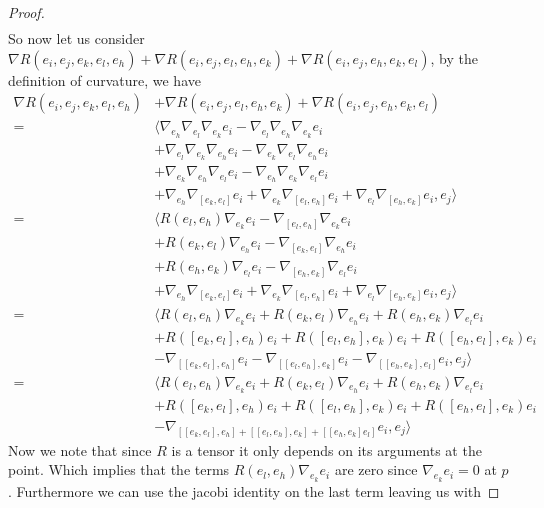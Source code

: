 \documentclass[a4paper]{article}
\begin{document}
\begin{proof}
\[\begin{aligned}
    \end{aligned}
  \]
  So now let us consider $\nabla R(e_i, e_j, e_k, e_l, e_h) + \nabla R(e_i,e_j, e_l, e_h, e_k) + \nabla  R(e_i, e_j, e_h, e_k, e_l)$, by the definition of curvature, we have
  \[
    \begin{aligned}
      \nabla R(e_i, e_j, e_k, e_l, e_h) &+ \nabla R(e_i,e_j, e_l, e_h, e_k) + \nabla  R(e_i, e_j, e_h, e_k, e_l)  \\ 
      =& \langle \nabla_{e_h}\nabla_{e_l}\nabla_{e_k}e_i - \nabla_{e_l}\nabla_{e_h}\nabla_{e_k}e_i \\ 
      &+ \nabla_{e_l}\nabla_{e_k}\nabla_{e_h}e_i - \nabla_{e_k}\nabla_{e_l}\nabla_{e_h}e_i \\
      &+ \nabla_{e_k}\nabla_{e_h}\nabla_{e_l}e_i - \nabla_{e_h}\nabla_{e_k}\nabla_{e_l}e_i \\
      &+ \nabla_{e_h} \nabla_{[e_k, e_l]} e_i + \nabla_{e_k}\nabla_{[e_l,e_h]}e_i + \nabla_{e_l} \nabla_{[e_h,e_k]}e_i, e_j\rangle \\
      =& \langle R(e_l, e_h)\nabla_{e_k}e_i - \nabla_{[e_l,e_h]}\nabla_{e_k}e_i \\
       &+ R(e_k, e_l) \nabla_{e_h}e_i - \nabla_{[e_k,e_l]}\nabla_{e_h}e_i \\
       &+ R(e_h, e_k) \nabla_{e_l}e_i - \nabla_{[e_h,e_k]}\nabla_{e_l}e_i \\
       &+\nabla_{e_h} \nabla_{[e_k, e_l]} e_i + \nabla_{e_k}\nabla_{[e_l,e_h]}e_i + \nabla_{e_l} \nabla_{[e_h,e_k]}e_i, e_j\rangle \\
      =& \langle R(e_l, e_h) \nabla_{e_k}e_i + R(e_k, e_l) \nabla_{e_h}e_i + R(e_h, e_k)\nabla_{e_l}e_i \\
       &+ R([e_k,e_l], e_h)e_i + R([e_l,e_h],e_k)e_i + R([e_h,e_l],e_k)e_i\\
       &- \nabla_{[[e_k,e_l],e_h]}e_i - \nabla_{[[e_l, e_h],e_k]}e_i - \nabla_{[[e_h,e_k],e_l]}e_i, e_j \rangle \\
      =& \langle R(e_l, e_h) \nabla_{e_k}e_i + R(e_k, e_l) \nabla_{e_h}e_i + R(e_h, e_k)\nabla_{e_l}e_i \\
       &+ R([e_k,e_l], e_h)e_i + R([e_l,e_h],e_k)e_i + R([e_h,e_l],e_k)e_i\\
       &- \nabla_{[[e_k,e_l],e_h] + [[e_l,e_h],e_k] + [[e_h,e_k]e_l]}e_i, e_j \rangle
    \end{aligned}
  \]
  Now we note that since $R$ is a tensor it only depends on its arguments at the point. Which implies that the terms $R(e_l, e_h)\nabla_{e_k}e_i$ are zero since $\nabla_{e_k}e_i =0$ at $p$. Furthermore we can use the jacobi identity on the last term leaving us with

\end{proof}
\end{document}
